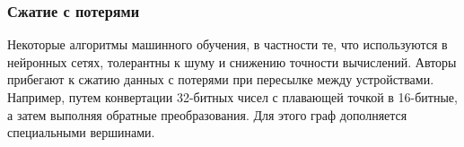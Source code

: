 \subsubsection{Сжатие с потерями}

Некоторые алгоритмы машинного обучения, в частности те, что используются в
нейронных сетях, толерантны к шуму и снижению точности вычислений. Авторы
прибегают к сжатию данных с потерями при пересылке между устройствами. Например,
путем конвертации 32-битных чисел с плавающей точкой в 16-битные, а затем
выполняя обратные преобразования. Для этого граф дополняется специальными
вершинами.

